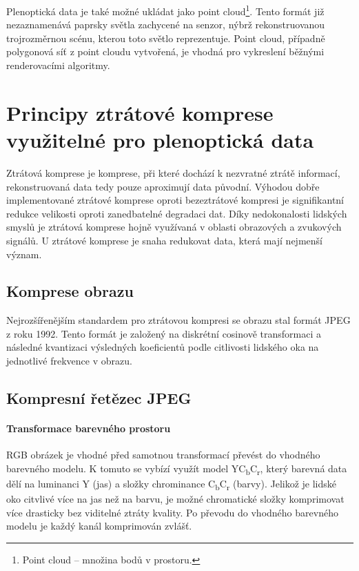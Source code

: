 Plenoptická data je také možné ukládat jako point cloud\footnote{Point cloud -- množina bodů v prostoru.}.
Tento formát již nezaznamenává paprsky světla zachycené na senzor, nýbrž rekonstruovanou trojrozměrnou scénu, kterou toto světlo reprezentuje.
Point cloud, případně polygonová síť z point cloudu vytvořená, je vhodná pro vykreslení běžnými renderovacími algoritmy.



\chapter{Principy ztrátové komprese využitelné pro plenoptická data}
\label{kompres-teo}
Ztrátová komprese je komprese, při které dochází k nezvratné ztrátě informací, rekonstruovaná data tedy pouze aproximují data původní.
Výhodou dobře implementované ztrátové komprese oproti bezeztrátové kompresi je signifikantní redukce velikosti oproti zanedbatelné degradaci dat.
Díky nedokonalosti lidských smyslů je ztrátová komprese hojně využívaná v oblasti obrazových a zvukových signálů.
U ztrátové komprese je snaha redukovat data, která mají nejmenší význam.

\section{Komprese obrazu}
Nejrozšířenějším standardem pro ztrátovou kompresi se obrazu stal formát JPEG z roku 1992.
Tento formát je založený na diskrétní cosinově transformaci a následné kvantizaci výsledných koeficientů podle citlivosti lidského oka na jednotlivé frekvence v obrazu.

\section{Kompresní řetězec JPEG}
\label{jpeg}

\subsubsection*{Transformace barevného prostoru}

RGB obrázek je vhodné před samotnou transformací převést do vhodného barevného modelu.
K tomuto se vybízí využít model YC\textsubscript{b}C\textsubscript{r}, který barevná data dělí na luminanci Y (jas) a složky chrominance C\textsubscript{b}C\textsubscript{r} (barvy).
Jelikož je lidské oko citvlivé více na jas než na barvu, je možné chromatické složky komprimovat více drasticky bez viditelné ztráty kvality.
Po převodu do vhodného barevného modelu je každý kanál komprimován zvlášť.

